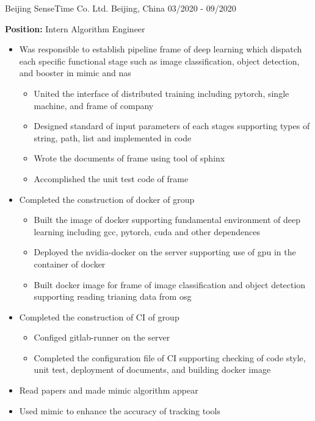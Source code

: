 

\begin{cventries}
  
  \cventry
    {}
    {Beijing SenseTime Co. Ltd.}
    {Beijing, China}
    {03/2020 - 09/2020}
    {
      \textbf{Position:} Intern Algorithm Engineer
      \begin{itemize}
        \item {Was responsible to establish pipeline frame of deep learning which dispatch each specific functional stage such as image classification, object detection, and booster in mimic and nas}
          \begin{itemize}
            \item {United the interface of distributed training including pytorch, single machine, and frame of company}
            \item {Designed standard of input parameters of each stages supporting types of string, path, list and implemented in code}
            \item {Wrote the documents of frame using tool of sphinx}
            \item {Accomplished the unit test code of frame}
          \end{itemize}
        \item {Completed the construction of docker of group}
          \begin{itemize}
            \item {Built the image of docker supporting fundamental environment of deep learning including gcc, pytorch, cuda and other dependences}
            \item {Deployed the nvidia-docker on the server supporting use of gpu in the container of docker}
            \item {Built docker image for frame of image classification and object detection supporting reading trianing data from osg}
          \end{itemize}
        \item {Completed the construction of CI of group}
          \begin{itemize}
            \item {Configed gitlab-runner on the server}
            \item {Completed the configuration file of CI supporting checking of code style, unit test, deployment of documents, and building docker image}
          \end{itemize}
        \item {Read papers and made mimic algorithm appear}
        \item {Used mimic to enhance the accuracy of tracking tools}
      \end{itemize}
    }

\end{cventries}
